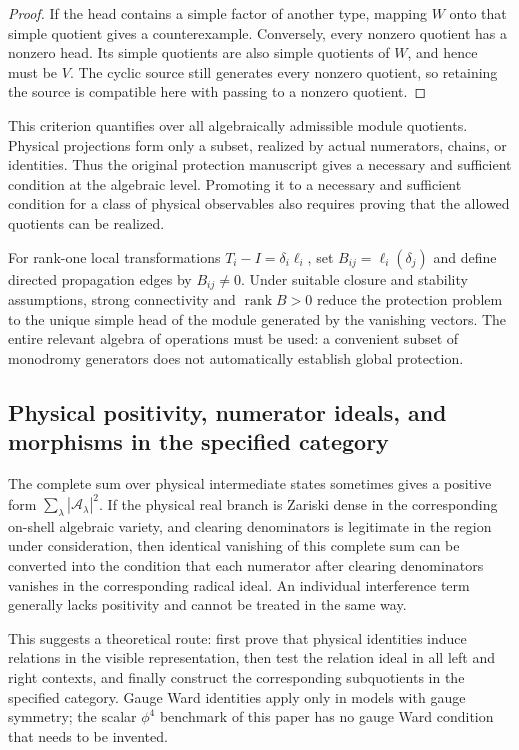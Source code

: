 \documentclass[11pt,a4paper,oneside]{article}
\theoremstyle{plain}
\theoremstyle{definition}
\theoremstyle{remark}
\newcommand{\rank}{\operatorname{rank}}
\numberwithin{equation}{section}
\begin{document}
\begin{proof}
If the head contains a simple factor of another type, mapping $W$ onto that simple quotient gives a counterexample. Conversely, every nonzero quotient has a nonzero head. Its simple quotients are also simple quotients of $W$, and hence must be $V$. The cyclic source still generates every nonzero quotient, so retaining the source is compatible here with passing to a nonzero quotient.
\end{proof}

This criterion quantifies over all algebraically admissible module quotients. Physical projections form only a subset, realized by actual numerators, chains, or identities. Thus the original protection manuscript gives a necessary and sufficient condition at the algebraic level. Promoting it to a necessary and sufficient condition for a class of physical observables also requires proving that the allowed quotients can be realized.

For rank-one local transformations $T_i-I=\delta_i\ell_i$, set $B_{ij}=\ell_i(\delta_j)$ and define directed propagation edges by $B_{ij}\ne0$. Under suitable closure and stability assumptions, strong connectivity and $\rank B>0$ reduce the protection problem to the unique simple head of the module generated by the vanishing vectors. The entire relevant algebra of operations must be used: a convenient subset of monodromy generators does not automatically establish global protection.


\subsection{Physical positivity, numerator ideals, and morphisms in the specified category}
The complete sum over physical intermediate states sometimes gives a positive form $\sum_\lambda|\mathcal A_\lambda|^2$. If the physical real branch is Zariski dense in the corresponding on-shell algebraic variety, and clearing denominators is legitimate in the region under consideration, then identical vanishing of this complete sum can be converted into the condition that each numerator after clearing denominators vanishes in the corresponding radical ideal. An individual interference term generally lacks positivity and cannot be treated in the same way.

This suggests a theoretical route: first prove that physical identities induce relations in the visible representation, then test the relation ideal in all left and right contexts, and finally construct the corresponding subquotients in the specified category. Gauge Ward identities apply only in models with gauge symmetry; the scalar $\phi^4$ benchmark of this paper has no gauge Ward condition that needs to be invented.
\end{document}
